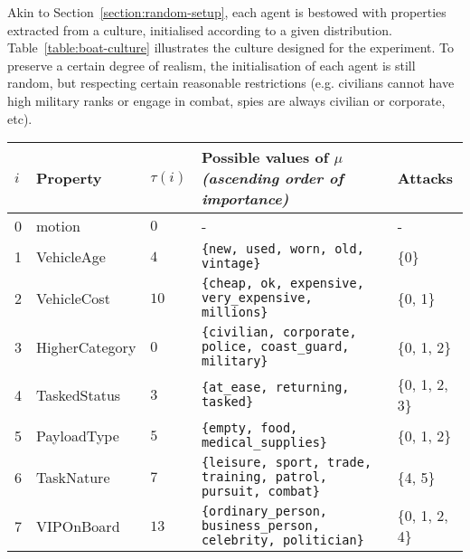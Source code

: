 \documentclass[acmsmall]{custom-arxiv}  %
\begin{document}
Akin to Section~\ref{section:random-setup}, each agent is bestowed with properties extracted from a culture, initialised according to a given distribution. Table~\ref{table:boat-culture} illustrates the culture designed for the experiment. To preserve a certain degree of realism, the initialisation of each agent is still random, but respecting certain reasonable restrictions (e.g. civilians cannot have high military ranks or engage in combat, spies are always civilian or corporate, etc).
\begin{table}[]

\begin{tabularx}{\textwidth}{|l|l|l|X|l|}
\hline
$i$  & \textbf{Property}            & $\tau(i)$      & \textbf{Possible values} of $\mu$ \textit{(ascending order of importance)}                                         & \textbf{Attacks}               \\ \hline
0  & motion                & $0$            & -                                                                                                & -                     \\ \hline
1  & VehicleAge            & $4$            & \texttt{\{new, used, worn, old, vintage\}}                                                       & \{0\}                 \\ \hline
2  & VehicleCost           & $10$           & \texttt{\{cheap, ok, expensive, very\_expensive, millions\}}                                     & \{0, 1\}              \\ \hline
3  & HigherCategory        & $0$            & \texttt{\{civilian, corporate, police, coast\_guard, military\}}                                 & \{0, 1, 2\}           \\ \hline
4  & TaskedStatus          & $3$            & \texttt{\{at\_ease, returning, tasked\}}                                                         & \{0, 1, 2, 3\}        \\ \hline
5  & PayloadType           & $5$            & \texttt{\{empty, food, medical\_supplies\}}                                                      & \{0, 1, 2\}           \\ \hline
6  & TaskNature            & $7$            & \texttt{\{leisure, sport, trade, training, patrol, pursuit, combat\}}                            & \{4, 5\}              \\ \hline
7  & VIPOnBoard            & $13$           & \texttt{\{ordinary\_person, business\_person, celebrity, politician\}}                           & \{0, 1, 2, 4\}        \\ \hline

\end{tabularx}
\end{table}
\end{document}
